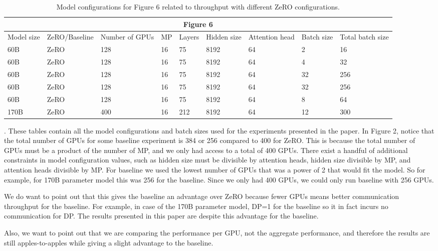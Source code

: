 \documentclass{article}
\begin{document}
\begin{table}[t!]
\scriptsize
\begin{tabular}{|l|l|l|l|l|l|l|l|l|}
\hline
\multicolumn{9}{|c|}{Figure 6} \\ \hline
Model size & ZeRO/Baseline & Number of GPUs & MP & Layers & Hidden size & Attention head & Batch size & Total batch size \\ \hline
60B & ZeRO & 128 & 16 & 75 & 8192 & 64 & 2 & 16 \\ \hline
60B & ZeRO & 128 & 16 & 75 & 8192 & 64 & 4 & 32 \\ \hline
60B & ZeRO & 128 & 16 & 75 & 8192 & 64 & 32 & 256 \\ \hline
60B & ZeRO & 128 & 16 & 75 & 8192 & 64 & 32 & 256 \\ \hline
60B & ZeRO & 128 & 16 & 75 & 8192 & 64 & 8 & 64 \\ \hline
170B & ZeRO & 400 & 16 & 212 & 8192 & 64 & 12 & 300 \\ \hline
\end{tabular}
\caption{Model configurations for Figure 6 related to throughput with different ZeRO configurations.}
\end{table}
.
\newpage
These tables contain all the model configurations and batch sizes used for the experiments presented in the paper. In Figure 2, notice that the total number of GPUs for some baseline experiment is 384 or 256 compared to 400 for ZeRO. This is because the total number of GPUs must be a product of the number of MP, and we only had access to a total of 400 GPUs. There exist a handful of additional constraints in model configuration values, such as hidden size must be divisible by attention heads, hidden size divisible by MP, and attention heads divisible by MP. For baseline we used the lowest number of GPUs that was a power of 2 that would fit the model. So for example, for 170B parameter model this was 256 for the baseline. Since we only had 400 GPUs, we could only run baseline with 256 GPUs. 

We do want to point out that this gives the baseline an advantage over ZeRO because fewer GPUs means better communication throughput for the baseline. For example, in case of the 170B parameter model, DP=1 for the baseline so it in fact incurs no communication for DP. The results presented in this paper are despite this advantage for the baseline.

Also, we want to point out that we are comparing the performance per GPU, not the aggregate performance, and therefore the results are still apples-to-apples while giving a slight advantage to the baseline.
\end{document}
